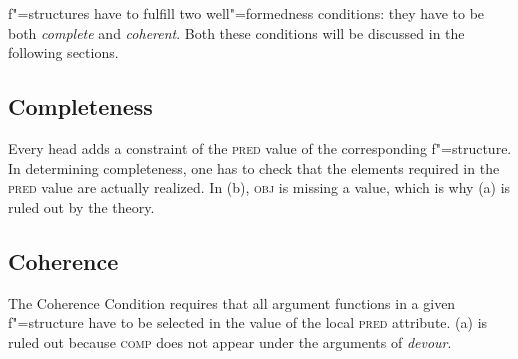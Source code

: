 
\noindent
f"=structures have to fulfill two well"=formedness conditions: they have to be both \emph{complete} and \emph{coherent}. Both these conditions will be
discussed in the following sections.

\subsection{Completeness}

Every head adds a constraint of the \textsc{pred} value of the corresponding f"=structure. In determining completeness, one has to check that the elements required
in the \textsc{pred} value are actually realized. In (b), \textsc{obj} is missing a value, which is
why (a) is ruled out by the theory.

\eal
{}
\zl

\subsection{Coherence}

The Coherence Condition requires that all argument functions in a given f"=structure have to be selected in the value of the local 
 \textsc{pred} attribute. (a) is ruled out because \textsc{comp} does not appear under the arguments of \emph{devour}.

\eal
{}
\zl

